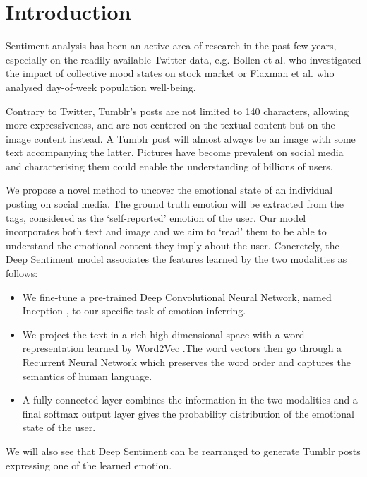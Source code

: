 \chapter{Introduction}

Sentiment analysis has been an active area of research in the past few years, especially on the readily available Twitter data, e.g. Bollen et al. \cite{bollen} who investigated the impact of collective mood states on stock market or Flaxman et al. \cite{seth-twitter} who analysed day-of-week population well-being.

Contrary to Twitter, Tumblr's posts are not limited to 140 characters, allowing more expressiveness, and are not centered on the textual content but on the image content instead. A Tumblr post will almost always be an image with some text accompanying the latter. Pictures have become prevalent on social media and characterising them could enable the understanding of billions of users. 

We propose a novel method to uncover the emotional state of an individual posting on social media. The ground truth emotion will be extracted from the tags, considered as the `self-reported' emotion of the user. Our model incorporates both text and image and we aim to `read' them to be able to understand the emotional content they imply about the user. Concretely, the Deep Sentiment model associates the features learned by the two modalities as follows:

\begin{itemize}
    \item We fine-tune a pre-trained Deep Convolutional Neural Network, named Inception \cite{googlenet}, to our specific task of emotion inferring.
    \item We project the text in a rich high-dimensional space with a word representation learned by Word2Vec \cite{word2vec}.The word vectors then go through a Recurrent Neural Network which preserves the word order and captures the semantics of human language.
    \item A fully-connected layer combines the information in the two modalities and a final softmax output layer gives the probability distribution of the emotional state of the user.
\end{itemize}

We will also see that Deep Sentiment can be rearranged to generate Tumblr posts expressing one of the learned emotion.









